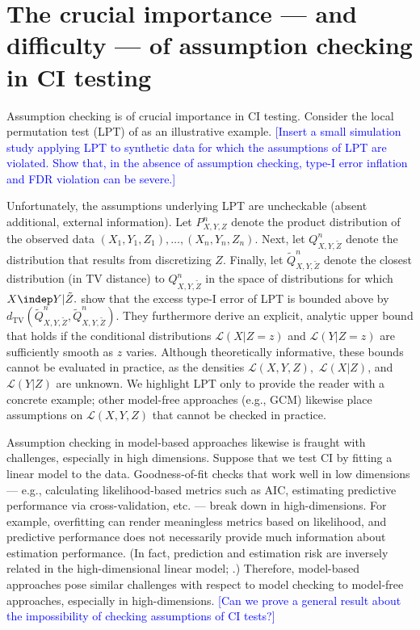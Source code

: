 \documentclass[12pt]{article}
\begin{document}
\section{The crucial importance --- and difficulty --- of assumption checking in CI testing}

Assumption checking is of crucial importance in CI testing. Consider the local permutation test (LPT) of \cite{Kim2021} as an illustrative example. \textcolor{blue}{[Insert a small simulation study applying LPT to synthetic data for which the assumptions of LPT are violated. Show that, in the absence of assumption checking, type-I error inflation and FDR violation can be severe.]}

Unfortunately, the assumptions underlying LPT are uncheckable (absent additional, external information). Let $P^n_{X,Y,Z}$ denote the product distribution of the observed data $(X_1, Y_1, Z_1), \dots, (X_n, Y_n, Z_n)$. Next, let $Q^n_{X, Y, \tilde{Z}}$ denote the distribution that results from discretizing $Z$. Finally, let $\tilde{Q}^n_{X,Y,\tilde{Z}}$ denote the closest distribution (in TV distance) to $Q^n_{X,Y,\tilde{Z}}$ in the space of distributions for which $X \indep Y | \tilde{Z}.$ \textcite{Kim2021} show that the excess type-I error of LPT is bounded above by $d_{\textrm{TV}}\left( \tilde{Q}^n_{X,Y,\tilde{Z}}, \tilde{Q}^n_{X,Y,\tilde{Z}} \right)$. They furthermore derive an explicit, analytic upper bound that holds if the conditional distributions $\mathcal{L}(X|Z=z)$ and $\mathcal{L}(Y|Z=z)$ are sufficiently smooth as $z$ varies. Although theoretically informative, these bounds cannot be evaluated in practice, as the densities $\mathcal{L}(X,Y,Z),$ $\mathcal{L}(X|Z)$, and $\mathcal{L}(Y|Z)$ are unknown. We highlight LPT only to provide the reader with a concrete example; other model-free approaches (e.g., GCM) likewise place assumptions on $\mathcal{L}(X,Y,Z)$ that cannot be checked in practice.

Assumption checking in model-based approaches likewise is fraught with challenges, especially in high dimensions. Suppose that we test CI by fitting a linear model to the data. Goodness-of-fit checks that work well in low dimensions --- e.g., calculating likelihood-based metrics such as AIC, estimating predictive performance via cross-validation, etc. --- break down in high-dimensions. For example, overfitting can render meaningless metrics based on likelihood, and predictive performance does not necessarily provide much information about estimation performance. (In fact, prediction and estimation risk are inversely related in the high-dimensional linear model; \textcite{Dobriban2018}.) Therefore, model-based approaches pose similar challenges with respect to model checking to model-free approaches, especially in high-dimensions. \textcolor{blue}{[Can we prove a general result about the impossibility of checking assumptions of CI tests?]}
\end{document}
